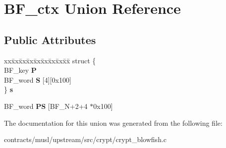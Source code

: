 \hypertarget{union_b_f__ctx}{}\section{B\+F\+\_\+ctx Union Reference}
\label{union_b_f__ctx}
\subsection*{Public Attributes}
\begin{DoxyCompactItemize}
\item 
\mbox{\label{union_b_f__ctx_a197056aa1e225d7552a5fa0d7a0b5455}} 
\begin{tabbing}
xx\=xx\=xx\=xx\=xx\=xx\=xx\=xx\=xx\=\kill
struct \{\\
\>BF\_key {\bfseries P}\\
\>BF\_word {\bfseries S} \mbox{[}4\mbox{]}\mbox{[}0x100\mbox{]}\\
\} {\bfseries s}\\

\end{tabbing}\item 
\mbox{\label{union_b_f__ctx_af82da2a1f076051a6ec533302c922097}} 
B\+F\+\_\+word {\bfseries PS} \mbox{[}B\+F\+\_\+N+2+4 $\ast$0x100\mbox{]}
\end{DoxyCompactItemize}


The documentation for this union was generated from the following file\+:\begin{DoxyCompactItemize}
\item 
contracts/musl/upstream/src/crypt/crypt\+\_\+blowfish.\+c\end{DoxyCompactItemize}
